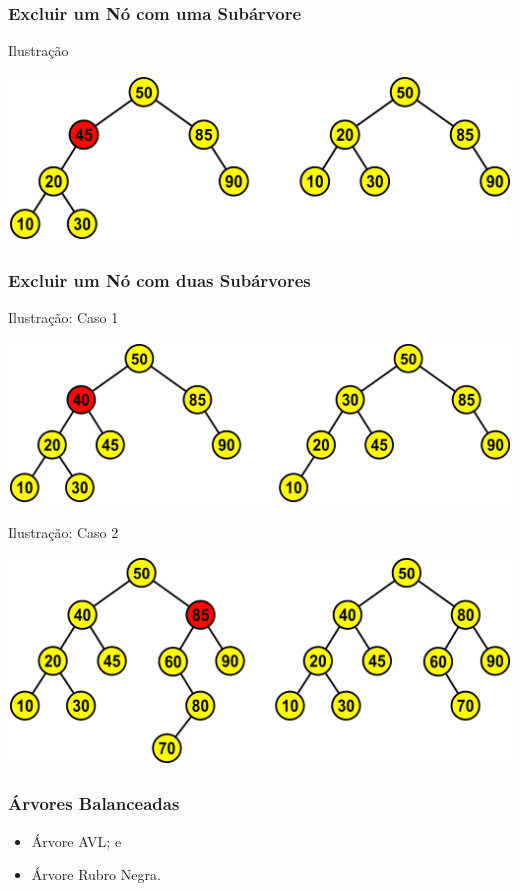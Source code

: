 \documentclass{beamer}
\begin{document}
\begin{frame}
\frametitle{Excluir um Nó com uma Subárvore}

\begin{exampleblock}{Ilustração}
	\begin{center}
		\includegraphics[scale=0.5]{img/arvore-excluir-uma-subarvore.png}
	\end{center}
\end{exampleblock}
\end{frame}

\begin{frame}
\frametitle{Excluir um Nó com duas Subárvores}

\begin{exampleblock}{Ilustração: Caso 1}
	\begin{center}
		\includegraphics[scale=0.4]{img/arvore-excluir-duas-subarvores-caso1.png}
	\end{center}
\end{exampleblock}\vfill

\begin{exampleblock}{Ilustração: Caso 2}
	\begin{center}
		\includegraphics[scale=0.4]{img/arvore-excluir-duas-subarvores-caso2.png}
	\end{center}
\end{exampleblock}
\end{frame}

\begin{frame}
\frametitle{Árvores Balanceadas}
\begin{itemize}
	\item Árvore AVL; e
	\item Árvore Rubro Negra.
\end{itemize}
\end{frame}
\end{document}
